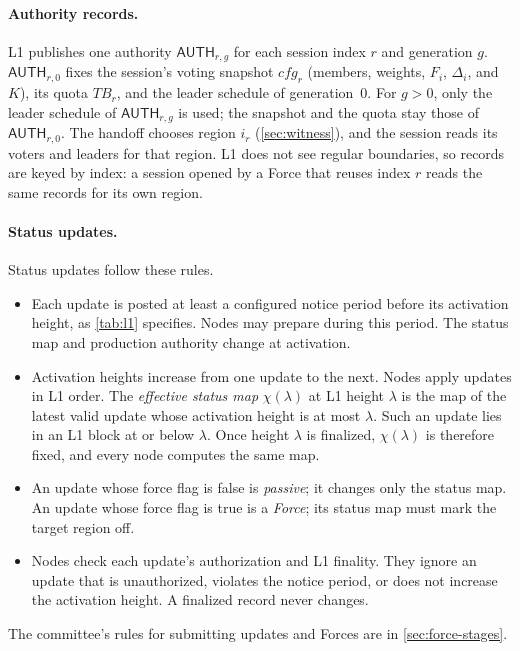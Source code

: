 \documentclass[11pt,a4paper]{article}
\newif\ifrevmarks
\newcommand{\Rv}[1]{\ifrevmarks\leavevmode{\color{rvBlue}#1}\else#1\fi}
\newcommand{\Cid}[1]{\ifrevmarks\textsuperscript{\hyperlink{chg:#1}{\color{rvBlue}\sffamily\scriptsize#1}}\fi}
\newcommand{\TB}{\mathit{TB}}
\newcommand{\tagg}[1]{\ensuremath{\mathsf{#1}}}
\begin{document}
\paragraph{\Rv{Authority records.}}
\Rv{L1 publishes one authority $\tagg{AUTH}_{r,g}$ for each
session index $r$ and generation $g$. $\tagg{AUTH}_{r,0}$ fixes the
session's voting snapshot $\mathit{cfg}_r$ (members, weights, $F_i$,
$\Delta_i$, and $K$), its quota $\TB_r$, and the leader schedule of
generation~$0$. For $g>0$, only the leader schedule of $\tagg{AUTH}_{r,g}$ is
used; the snapshot and the quota stay those of $\tagg{AUTH}_{r,0}$. The handoff chooses region $i_r$
(\cref{sec:witness}), and the session reads its voters and leaders for
that region. L1 does not see regular boundaries, so records are keyed by
index: a session opened by a Force that reuses index $r$ reads the same
records for its own region.}

\paragraph{\Rv{Status updates.}}
Status updates follow these rules.
\begin{itemize}
\item Each update is posted at least a configured notice period before
its activation height\Rv{, as \cref{tab:l1} specifies}. Nodes may prepare during this period. The status map and production authority change at activation.
\item Activation heights increase from one update to the next. Nodes
apply updates in L1 order. The \emph{effective status map}
$\chi(\lambda)$ at L1 height $\lambda$ is the map of the latest \Rv{valid}
update whose activation height is at most $\lambda$. \Rv{Such an
update lies in an L1 block at or below $\lambda$. Once height $\lambda$ is
finalized, $\chi(\lambda)$ is therefore fixed, and every node computes
the same map.}
\item \Rv{An update whose force flag is false is \emph{passive};
it changes only the status map. An update whose force flag is true is a
\emph{Force}; its status map must mark the target region off.}
\item Nodes check each update's authorization and L1 finality.
\Rv{They ignore an update that is unauthorized, violates the
notice period, or does not increase the activation height.} A
finalized record never changes.
\end{itemize}
\Rv{The committee's rules for submitting updates and Forces are
in \cref{sec:force-stages}.}
\end{document}
